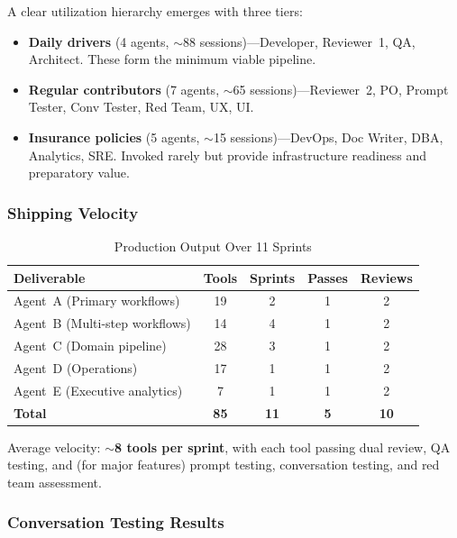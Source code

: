 \documentclass[11pt,a4paper]{article}
\begin{document}
A clear utilization hierarchy emerges with three tiers:
\begin{itemize}[leftmargin=*]
    \item \textbf{Daily drivers} (4 agents, $\sim$88 sessions)---Developer, Reviewer~1, QA, Architect. These form the minimum viable pipeline.
    \item \textbf{Regular contributors} (7 agents, $\sim$65 sessions)---Reviewer~2, PO, Prompt Tester, Conv Tester, Red Team, UX, UI.
    \item \textbf{Insurance policies} (5 agents, $\sim$15 sessions)---DevOps, Doc Writer, DBA, Analytics, SRE. Invoked rarely but provide infrastructure readiness and preparatory value.
\end{itemize}

\subsubsection{Shipping Velocity}

\begin{table}[htbp]
\caption{Production Output Over 11 Sprints}
\label{tab:velocity}
\centering
\footnotesize
\begin{tabular}{@{}lcccc@{}}
\toprule
\textbf{Deliverable} & \textbf{Tools} & \textbf{Sprints} & \textbf{Passes} & \textbf{Reviews} \\
\midrule
Agent~A (Primary workflows) & 19 & 2 & 1 & 2 \\
Agent~B (Multi-step workflows) & 14 & 4 & 1 & 2 \\
Agent~C (Domain pipeline) & 28 & 3 & 1 & 2 \\
Agent~D (Operations) & 17 & 1 & 1 & 2 \\
Agent~E (Executive analytics) & 7 & 1 & 1 & 2 \\
\midrule
\textbf{Total} & \textbf{85} & \textbf{11} & \textbf{5} & \textbf{10} \\
\bottomrule
\end{tabular}
\end{table}

Average velocity: \textbf{$\sim$8 tools per sprint}, with each tool passing dual review, QA testing, and (for major features) prompt testing, conversation testing, and red team assessment.

\subsubsection{Conversation Testing Results}
\end{document}
